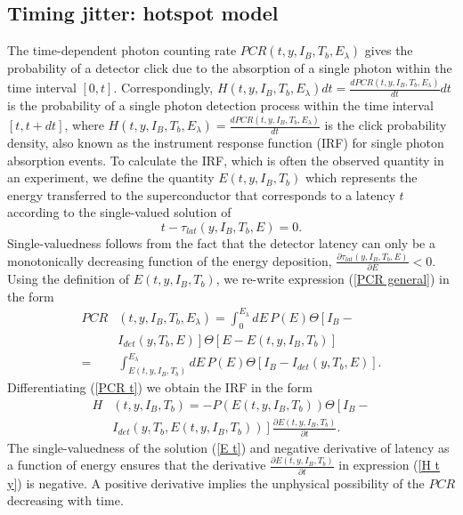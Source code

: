 \documentclass[%
reprint,
 amsmath,amssymb,
aps,
pra,
]{revtex4-1}
\begin{document}
\subsection{\label{sec:HSModel}Timing jitter: hotspot model}
\quad The time-dependent photon counting rate \(PCR(t,y,I_B,T_b,E_\lambda)\) gives the probability of a detector click due to the absorption of a single photon within the time interval \(\left[0,t\right]\). Correspondingly, \(H(t,y,I_B,T_b,E_\lambda)dt = \frac{dPCR(t,y,I_B,T_b,E_\lambda)}{dt}dt\) is the probability of a single photon detection process within the time interval \(\left[t,t+dt\right]\), where \(H(t,y,I_B,T_b,E_\lambda) = \frac{dPCR(t,y,I_B,T_b,E_\lambda)}{dt}\) is the click probability density, also known as the instrument response function (IRF) for single photon absorption events.  To calculate the IRF, which is often the observed quantity in an experiment, we define the quantity \(E(t, y,I_B,T_b)\) which represents the energy transferred to the superconductor that corresponds to a latency \(t\) according to the single-valued solution of 
\begin{equation}\label{E t}
t - \tau_{lat}( y,I_B,T_b,E)= 0\text{.}
\end{equation}
Single-valuedness follows from the fact that the detector latency can only be a monotonically decreasing function of the energy deposition, \(\displaystyle{\frac{\partial \tau_{lat}(y,I_B,T_b,E)}{\partial E} < 0}\). Using the definition of \(E(t, y,I_B,T_b)\), we re-write expression (\ref{PCR general}) in the form
\begin{equation}\label{PCR t}
\begin{aligned}
PCR&(t,y,I_B,T_b,E_\lambda)=\int_0^{E_\lambda}dE\, P(E)\Theta\left[I_B-{}\right.\\ 
  &\left.I_{det}(y,T_b,E)\right]\Theta\left[E-E(t, y,I_B,T_b)\right] \\
  {}=&\int_{E(t, y,I_B,T_b)}^{E_\lambda}dE\, P(E)\Theta\left[I_B-I_{det}(y,T_b,E)\right] \text{.}
\end{aligned}
\end{equation}
Differentiating  (\ref{PCR t}) we obtain the IRF in the form
\begin{equation}\label{H t y}
\begin{aligned}
H&(t, y,I_B,T_b)= -P\left(E\left(t, y,I_B,T_b\right)\right) \Theta\left[I_B-{}\right.\\
&\left.I_{det}(y,T_b,E\left(t, y,I_B,T_b\right))\right]\frac{\partial E\left(t, y,I_B,T_b\right)}{\partial t}\text{.}
\end{aligned}
\end{equation}
The single-valuedness of the solution (\ref{E t})  and negative derivative of latency as a function of energy ensures that the derivative \(\displaystyle{\frac{\partial E(t, y,I_B,T_b)}{\partial t}}\) in expression (\ref{H t y}) is negative. A positive derivative implies the unphysical possibility of the \(PCR\) decreasing with time.
\end{document}

